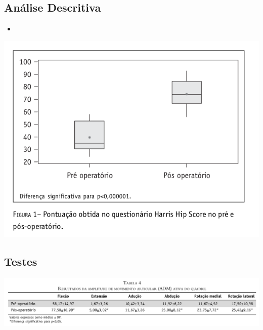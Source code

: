 \documentclass{beamer}
\begin{document}
\subsection{Análise Descritiva}

\begin{frame}
  \begin{itemize}
  \item 
  \end{itemize}
\end{frame}

\begin{frame}{}
  \begin{center}
    \includegraphics[height=.9\textheight]{figuras/figura1}
  \end{center}
\end{frame}

\subsection{Testes}

\begin{frame}{}
  \begin{center}
    \includegraphics[width=1.15\textwidth]{figuras/tabela4}
  \end{center}
\end{frame}
\end{document}
